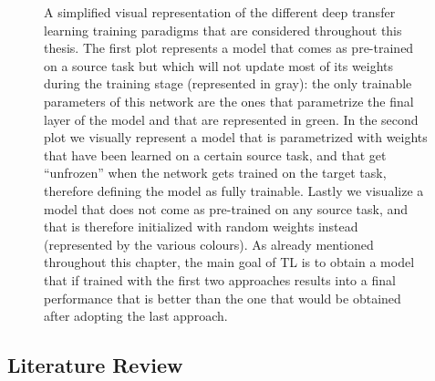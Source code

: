 \begin{figure}[!htb]
\endminipage
\caption{A simplified visual representation of the different deep transfer learning training paradigms that are considered throughout this thesis. The first plot represents a model that comes as pre-trained on a source task but which will not update most of its weights during the training stage (represented in gray): the only trainable parameters of this network are the ones that parametrize the final layer of the model and that are represented in green. In the second plot we visually represent a model that is parametrized with weights that have been learned on a certain source task, and that get ``unfrozen'' when the network gets trained on the target task, therefore defining the model as fully trainable. Lastly we visualize a model that does not come as pre-trained on any source task, and that is therefore initialized with random weights instead (represented by the various colours). As already mentioned throughout this chapter, the main goal of TL is to obtain a model that if trained with the first two approaches results into a final performance that is better than the one that would be obtained after adopting the last approach.}
\label{fig:network_training_approaches}
\end{figure}


\subsection{Literature Review}

